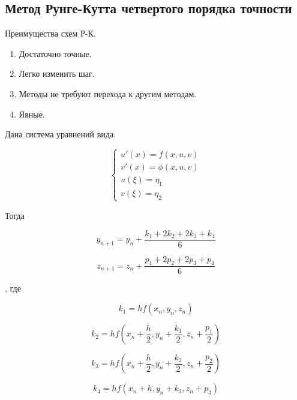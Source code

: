 \documentclass[a4paper,oneside,12pt]{extreport}
\begin{document}
\subsection{Метод Рунге-Кутта четвертого порядка точности}

Преимущества схем Р-К.
\begin{enumerate}
    \item Достаточно точные.
    \item Легко изменить шаг.
    \item Методы не требуют перехода к другим методам.
    \item Явные.
\end{enumerate}

Дана система уравнений вида:

\begin{equation}
	{\begin{cases}
			u'(x) = f(x,u,v) \\
			v'(x) = \phi(x,u,v) \\
			u(\xi) = \eta_1 \\
			v(\xi) = \eta_2
		\end{cases}}
		\label{eq:ref1}
\end{equation}

Тогда 

\begin{equation*}
    y_{n+1} = y_n + \frac{k_1+2k_2+2k_3+k_4}{6}
\end{equation*}
    
\begin{equation*}
    z_{n+1} = z_n + \frac{p_1+2p_2+2p_3+p_4}{6}
\end{equation*}

, где

\begin{equation*}
    k_1 = hf(x_n,y_n,z_n)
\end{equation*}

\begin{equation*}
    k_2 = hf(x_n + \frac{h}{2},y_n+\frac{k_1}{2},z_n+\frac{p_1}{2})
\end{equation*}

\begin{equation*}
    k_3 = hf(x_n + \frac{h}{2},y_n+\frac{k_2}{2},z_n+\frac{p_2}{2})
\end{equation*}

\begin{equation*}
    k_4 = hf(x_n + h,y_n+k_3,z_n+p_3)
\end{equation*}
\end{document}

